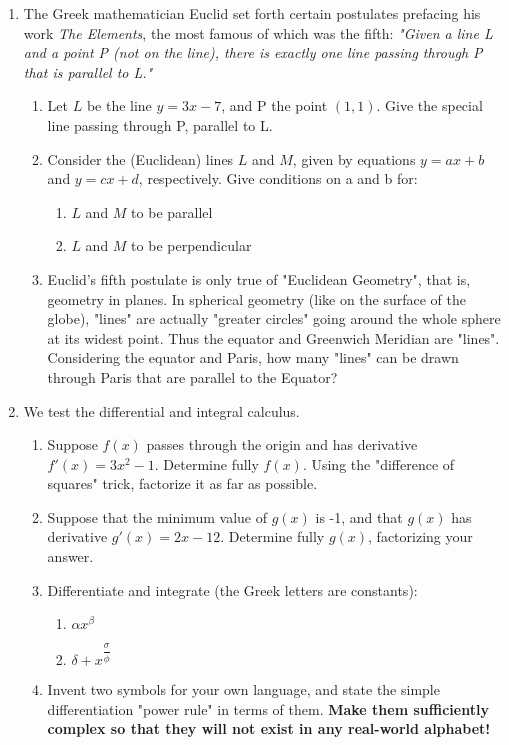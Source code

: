 \documentclass{article}
\begin{document}
\begin{enumerate}
	\item The Greek mathematician Euclid set forth certain postulates prefacing his work \textit{The Elements}, the most famous of which was the fifth: \textit{"Given a line L and a point P (not on the line), there is exactly one line passing through P that is parallel to L."}
		\begin{enumerate}
			\item Let $L$ be the line $y= 3x - 7$, and P the point $(1,1)$.  Give the special line passing through P, parallel to L.
			
			\item Consider the (Euclidean) lines $L$ and $M$, given by equations $y=ax + b$ and $y = cx + d$, respectively.  Give conditions on a and b for:
				\begin{enumerate}
					\item $L$ and $M$ to be parallel
					
					\item $L$ and $M$ to be perpendicular
				\end{enumerate}
			
			\item Euclid's fifth postulate is only true of "Euclidean Geometry", that is, geometry in planes.  In spherical geometry (like on the surface of the globe), "lines" are actually "greater circles" going around the whole sphere at its widest point.  Thus the equator and Greenwich Meridian are "lines".  Considering the equator and Paris, how many "lines" can be drawn through Paris that are parallel to the Equator?
			
			
		\end{enumerate}


	
	
	\item We test the differential and integral calculus.
	\begin{enumerate}
	
		\item Suppose $f(x)$ passes through the origin and has derivative $f'(x) = 3x^2 - 1$.  Determine fully $f(x)$.  Using the "difference of squares" trick, factorize it as far as possible.
		
		\item Suppose that the minimum value of $g(x)$ is -1, and that $g(x)$ has derivative $g'(x) = 2x-12$.  Determine fully $g(x)$, factorizing your answer.
		
		\item Differentiate and integrate (the Greek letters are constants):
			\begin{enumerate}
				\item $\alpha x^{\beta}$
				\item $\delta + x^{\dfrac{\sigma}{\phi}}$
			\end{enumerate}
		\item Invent two symbols for your own language, and state the simple differentiation "power rule" in terms of them.  \textbf{Make them sufficiently complex so that they will not exist in any real-world alphabet!}
	\end{enumerate}
	
\end{enumerate}
\end{document}
